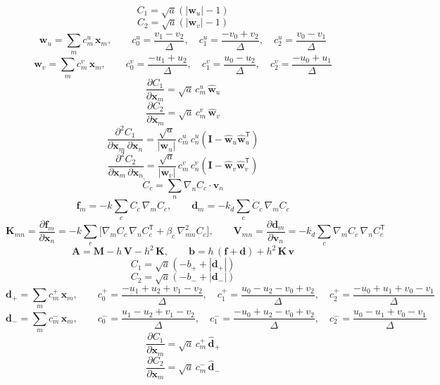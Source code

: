\[ C_{1} = \sqrt{a} \left(|\mathbf{w}_u| - 1\right) \]
\[ C_{2} = \sqrt{a} \left(|\mathbf{w}_v| - 1\right) \]
\[ \mathbf{w}_u = \sum_m c^{u}_{m}\,\mathbf{x}_m,\qquad c^{u}_{0} = \frac{v_{1} - v_{2}}{\Delta},\quad c^{u}_{1} = \frac{- v_{0} + v_{2}}{\Delta},\quad c^{u}_{2} = \frac{v_{0} - v_{1}}{\Delta} \]
\[ \mathbf{w}_v = \sum_m c^{v}_{m}\,\mathbf{x}_m,\qquad c^{v}_{0} = \frac{- u_{1} + u_{2}}{\Delta},\quad c^{v}_{1} = \frac{u_{0} - u_{2}}{\Delta},\quad c^{v}_{2} = \frac{- u_{0} + u_{1}}{\Delta} \]
\[ \frac{\partial C_{1}}{\partial \mathbf{x}_m} = \sqrt{a}\,c^{u}_{m}\,\hat{\mathbf{w}}_u \]
\[ \frac{\partial C_{2}}{\partial \mathbf{x}_m} = \sqrt{a}\,c^{v}_{m}\,\hat{\mathbf{w}}_v \]
\[ \frac{\partial^2 C_{1}}{\partial \mathbf{x}_m\,\partial \mathbf{x}_n} = \frac{\sqrt{a}}{|\mathbf{w}_u|}\,c^{u}_{m}\,c^{u}_{n}\left(\mathbf{I} - \hat{\mathbf{w}}_u\hat{\mathbf{w}}_u^{\mathsf T}\right) \]
\[ \frac{\partial^2 C_{2}}{\partial \mathbf{x}_m\,\partial \mathbf{x}_n} = \frac{\sqrt{a}}{|\mathbf{w}_v|}\,c^{v}_{m}\,c^{v}_{n}\left(\mathbf{I} - \hat{\mathbf{w}}_v\hat{\mathbf{w}}_v^{\mathsf T}\right) \]
\[ \dot C_c = \sum_n \nabla_n C_c\cdot\mathbf{v}_n \]
\[ \mathbf{f}_m = -k\sum_c C_c\,\nabla_m C_c,\qquad \mathbf{d}_m = -k_d\sum_c \dot C_c\,\nabla_m C_c \]
\[ \mathbf{K}_{mn} = \frac{\partial \mathbf{f}_m}{\partial \mathbf{x}_n} = -k\sum_c\Big[\nabla_m C_c\,\nabla_n C_c^{\mathsf T} + \beta_c\,\nabla^2_{mn} C_c\Big],\qquad \mathbf{V}_{mn} = \frac{\partial \mathbf{d}_m}{\partial \mathbf{v}_n} = -k_d\sum_c \nabla_m C_c\,\nabla_n C_c^{\mathsf T} \]
\[ \mathbf{A} = \mathbf{M} - h\,\mathbf{V} - h^2\,\mathbf{K},\qquad \mathbf{b} = h\,(\mathbf{f} + \mathbf{d}) + h^2\,\mathbf{K}\,\mathbf{v} \]
\[ C_{1} = \sqrt{a} \left(- b_{+} + |\mathbf{d}_{+}|\right) \]
\[ C_{2} = \sqrt{a} \left(- b_{-} + |\mathbf{d}_{-}|\right) \]
\[ \mathbf{d}_{+} = \sum_m c^{{+}}_{m}\,\mathbf{x}_m,\qquad c^{{+}}_{0} = \frac{- u_{1} + u_{2} + v_{1} - v_{2}}{\Delta},\quad c^{{+}}_{1} = \frac{u_{0} - u_{2} - v_{0} + v_{2}}{\Delta},\quad c^{{+}}_{2} = \frac{- u_{0} + u_{1} + v_{0} - v_{1}}{\Delta} \]
\[ \mathbf{d}_{-} = \sum_m c^{{-}}_{m}\,\mathbf{x}_m,\qquad c^{{-}}_{0} = \frac{u_{1} - u_{2} + v_{1} - v_{2}}{\Delta},\quad c^{{-}}_{1} = \frac{- u_{0} + u_{2} - v_{0} + v_{2}}{\Delta},\quad c^{{-}}_{2} = \frac{u_{0} - u_{1} + v_{0} - v_{1}}{\Delta} \]
\[ \frac{\partial C_{1}}{\partial \mathbf{x}_m} = \sqrt{a}\,c^{{+}}_{m}\,\hat{\mathbf{d}}_{+} \]
\[ \frac{\partial C_{2}}{\partial \mathbf{x}_m} = \sqrt{a}\,c^{{-}}_{m}\,\hat{\mathbf{d}}_{-} \]
